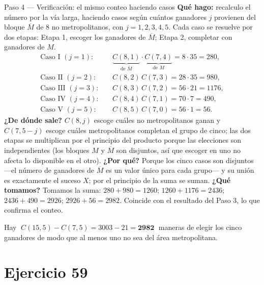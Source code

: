 \documentclass[11pt]{article}
\begin{document}
\begin{sol}
\begin{paso}{Paso 4 --- Verificación: el mismo conteo haciendo casos}
\textbf{Qué hago:} recalculo el número por la vía larga, haciendo casos según cuántos ganadores $j$ provienen del bloque $\overline{M}$ de $8$ no metropolitanos, con $j=1,2,3,4,5$. Cada caso se resuelve por dos etapas: Etapa 1, escoger los ganadores de $\overline{M}$; Etapa 2, completar con ganadores de $M$.
\[
\begin{aligned}
\text{Caso I }(j=1):&\quad \underbrace{C(8,1)}_{\text{de }\overline{M}}\cdot\underbrace{C(7,4)}_{\text{de }M}=8\cdot 35=280,\\
\text{Caso II }(j=2):&\quad C(8,2)\,C(7,3)=28\cdot 35=980,\\
\text{Caso III }(j=3):&\quad C(8,3)\,C(7,2)=56\cdot 21=1176,\\
\text{Caso IV }(j=4):&\quad C(8,4)\,C(7,1)=70\cdot 7=490,\\
\text{Caso V }(j=5):&\quad C(8,5)\,C(7,0)=56\cdot 1=56 .
\end{aligned}
\]
\textbf{¿De dónde sale?} $C(8,j)$ escoge cuáles no metropolitanos ganan y $C(7,5-j)$ escoge cuáles metropolitanos completan el grupo de cinco; las dos etapas se multiplican por el principio del producto porque las elecciones son independientes (los bloques $M$ y $\overline{M}$ son disjuntos, así que escoger en uno no afecta lo disponible en el otro).
\textbf{¿Por qué?} Porque los cinco casos son disjuntos —el número de ganadores de $\overline{M}$ es un valor único para cada grupo— y su unión es exactamente el suceso $X$; por el principio de la suma se suman.
\textbf{¿Qué tomamos?} Tomamos la suma: $280+980=1260$; $1260+1176=2436$; $2436+490=2926$; $2926+56=2982$. Coincide con el resultado del Paso 3, lo que confirma el conteo.
\end{paso}

\end{sol}

\begin{resp}
Hay $\;C(15,5)-C(7,5)=3003-21=\mathbf{2982}\;$ maneras de elegir los cinco ganadores de modo que al menos uno no sea del área metropolitana.
\end{resp}

\section*{Ejercicio 59}
\end{document}
